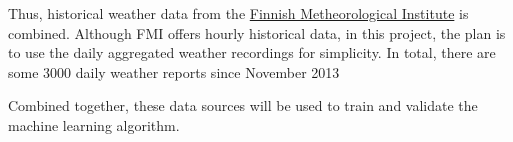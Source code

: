 \documentclass[12pt, a4paper]{report}
\begin{document}
    Thus, historical weather data from the \href{https://en.ilmatieteenlaitos.fi/download-observations}{Finnish Metheorological Institute}
    is combined. Although FMI offers hourly historical data, in this project, the plan is to use the daily aggregated weather recordings for simplicity. In total, there are some 3000 daily weather reports since November 2013
    
    Combined together, these data sources will be used to train and validate the machine learning algorithm.
            
\end{document}
